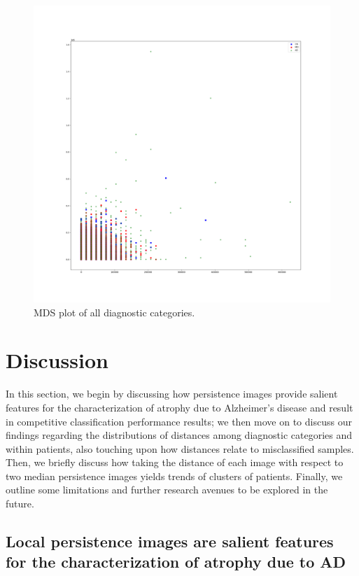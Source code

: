 \documentclass{article}
\begin{document}
\begin{figure}[htb]
  \centering
  \includegraphics[width=\textwidth]{figures/mds_plot.png}
  \caption{MDS plot of all diagnostic categories.}
  \label{fig:mds_plot}
\end{figure}

\section{Discussion}\label{sec:discussion}

In this section, we begin by discussing how persistence images provide salient features for the
characterization of atrophy due to Alzheimer's disease and result in competitive classification
performance results; we then move on to discuss our findings regarding the distributions of
distances among diagnostic categories and within patients, also touching upon how distances relate
to misclassified samples. Then, we briefly discuss how taking the distance of each image with
respect to two median persistence images yields trends of clusters of patients. Finally, we outline
some limitations and further research avenues to be explored in the future.

\subsection{Local persistence images are salient features for the characterization of atrophy due to AD }
\end{document}
